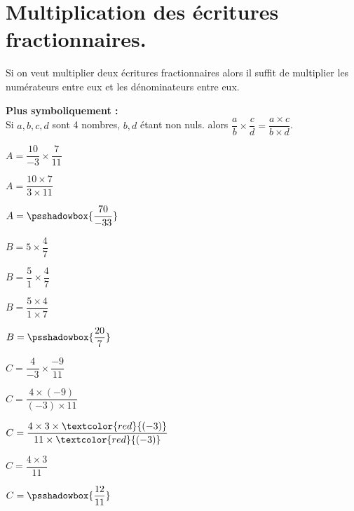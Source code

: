 \section{Multiplication des écritures fractionnaires.}
\begin{propriete}[\admise]
    Si on veut multiplier deux écritures fractionnaires alors il suffit de multiplier les numérateurs entre eux et les dénominateurs entre eux.

    \bigskip
    {\bfseries Plus symboliquement :}\\
    Si $a, b, c, d$ sont 4 nombres, $b, d$ étant non nuls. alors $\dfrac{a}{b}\times \dfrac{c}{d} = \dfrac{a\times c}{b\times d}$.
\end{propriete}


\begin{exemples*1}
    \begin{multicols}{3}
        \begin{spacing}{1.3}
            \begin{list}{}{}                
                \item $A=\dfrac{10}{-3}\times \dfrac{7}{11}$
                \item $A=\dfrac{10\times 7}{3\times 11}$
                \item $A= \psshadowbox{\dfrac{70}{-33}}$
                \columnbreak
                \item $B=5\times \dfrac{4}{7}$
                \item $B = \dfrac{5}{1}\times \dfrac{4}{7}$
                \item $B = \dfrac{5\times 4}{1\times 7}$
                \item $B = \psshadowbox{\dfrac{20}{7}}$
                \columnbreak
                \item $C=\dfrac{4}{-3}\times \dfrac{-9}{11}$
                \item $C = \dfrac{4\times (-9)}{(-3)\times 11}$
                \item $C = \dfrac{4\times 3\times \textcolor{red}{(-3)}}{11\times \textcolor{red}{(-3)}}$
                \item $C = \dfrac{4\times 3}{11}$
                \item $C = \psshadowbox{\dfrac{12}{11}}$
            \end{list}
        \end{spacing}
    \end{multicols}
\end{exemples*1}

